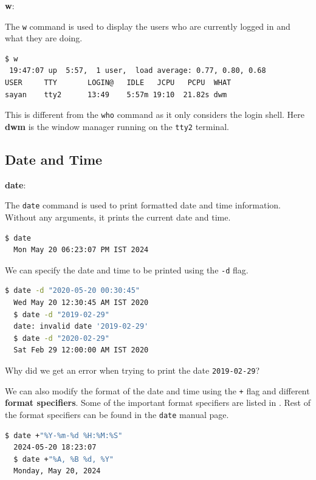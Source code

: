 \textbf{w}:

The \texttt{w} command is used to display the users who are currently logged in and what they are doing.

\begin{lstlisting}[language=bash]
$ w
 19:47:07 up  5:57,  1 user,  load average: 0.77, 0.80, 0.68
USER     TTY       LOGIN@   IDLE   JCPU   PCPU  WHAT
sayan    tty2      13:49    5:57m 19:10  21.82s dwm
\end{lstlisting}

This is different from the \texttt{who} command as it only considers the login shell.
Here \textbf{dwm} is the window manager running on the \texttt{tty2} terminal.

\subsection{Date and Time}

\textbf{date}:

The \texttt{date} command is used to print formatted date and time information.
Without any arguments, it prints the current date and time.

\begin{lstlisting}[language=bash]
  $ date
  Mon May 20 06:23:07 PM IST 2024
\end{lstlisting}

We can specify the date and time to be printed using the \texttt{-d} flag.

\begin{lstlisting}[language=bash]
  $ date -d "2020-05-20 00:30:45"
  Wed May 20 12:30:45 AM IST 2020
  $ date -d "2019-02-29"
  date: invalid date '2019-02-29'
  $ date -d "2020-02-29"
  Sat Feb 29 12:00:00 AM IST 2020
\end{lstlisting}

\begin{exercise}
  Why did we get an error when trying to print the date \texttt{2019-02-29}?
\end{exercise}

We can also modify the format of the date and time using the \texttt{+} flag and different \textbf{format specifiers}.
Some of the important format specifiers are listed in .
Rest of the format specifiers can be found in the \texttt{date} manual page.

\begin{lstlisting}[language=bash]
  $ date +"%Y-%m-%d %H:%M:%S"
  2024-05-20 18:23:07
  $ date +"%A, %B %d, %Y"
  Monday, May 20, 2024
\end{lstlisting}

